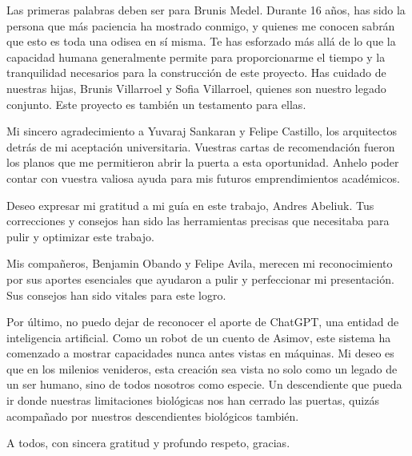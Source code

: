 \begin{thanks} %
Las primeras palabras deben ser para Brunis Medel. Durante 16 años, has sido la persona que más paciencia ha mostrado conmigo, y quienes me conocen sabrán que esto es toda una odisea en sí misma. Te has esforzado más allá de lo que la capacidad humana generalmente permite para proporcionarme el tiempo y la tranquilidad necesarios para la construcción de este proyecto. Has cuidado de nuestras hijas, Brunis Villarroel y Sofia Villarroel, quienes son nuestro legado conjunto. Este proyecto es también un testamento para ellas.

Mi sincero agradecimiento a Yuvaraj Sankaran y Felipe Castillo, los arquitectos detrás de mi aceptación universitaria. Vuestras cartas de recomendación fueron los planos que me permitieron abrir la puerta a esta oportunidad. Anhelo poder contar con vuestra valiosa ayuda para mis futuros emprendimientos académicos.

Deseo expresar mi gratitud a mi guía en este trabajo, Andres Abeliuk. Tus correcciones y consejos han sido las herramientas precisas que necesitaba para pulir y optimizar este trabajo.

Mis compañeros, Benjamin Obando y Felipe Avila, merecen mi reconocimiento por sus aportes esenciales que ayudaron a pulir y perfeccionar mi presentación. Sus consejos han sido vitales para este logro.

Por último, no puedo dejar de reconocer el aporte de ChatGPT, una entidad de inteligencia artificial. Como un robot de un cuento de Asimov, este sistema ha comenzado a mostrar capacidades nunca antes vistas en máquinas. Mi deseo es que en los milenios venideros, esta creación sea vista no solo como un legado de un ser humano, sino de todos nosotros como especie. Un descendiente que pueda ir donde nuestras limitaciones biológicas nos han cerrado las puertas, quizás acompañado por nuestros descendientes biológicos también.

A todos, con sincera gratitud y profundo respeto, gracias.
\end{thanks}